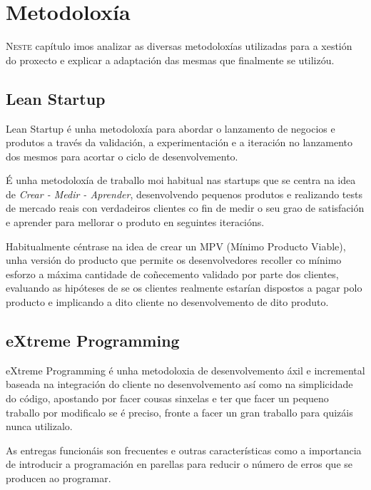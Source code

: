 \chapter{Metodoloxía}
\minitoc
\label{chap:Metodoloxia}
\vspace{0.5cm}


  \lettrine{N}{este} capítulo imos analizar as diversas metodoloxías utilizadas para a 
xestión do proxecto e explicar a adaptación das mesmas que finalmente se utilizóu.

  \section{Lean Startup}
  Lean Startup é unha metodoloxía para abordar o lanzamento de negocios e 
produtos a través da validación, a experimentación e a iteración no lanzamento 
dos mesmos para acortar o ciclo de desenvolvemento.

  É unha metodoloxía de traballo moi habitual nas startups que se centra na 
idea de \emph{Crear - Medir - Aprender}, desenvolvendo pequenos produtos e 
realizando tests de mercado reais con verdadeiros clientes co fin de medir o 
seu grao de satisfación e aprender para mellorar o produto en seguintes 
iteracións.
  
  Habitualmente céntrase na idea de crear un MPV (Mínimo Producto Viable), unha 
versión do producto que permite os desenvolvedores recoller co mínimo esforzo a 
máxima cantidade de coñecemento validado por parte dos clientes, evaluando as 
hipóteses de se os clientes realmente estarían dispostos a pagar polo 
producto e implicando a dito cliente no desenvolvemento de dito produto.
  
  \section{eXtreme Programming}
  eXtreme Programming é unha metodoloxia de desenvolvemento áxil e incremental 
baseada na integración do cliente no desenvolvemento así como na simplicidade 
do código, apostando por facer cousas sinxelas e ter que facer un pequeno 
traballo por modificalo se é preciso, fronte a facer un gran traballo para 
quizáis nunca utilizalo.

  As entregas funcionáis son frecuentes e outras características como a 
importancia de introducir a programación en parellas para reducir o número de 
erros que se producen ao programar.

